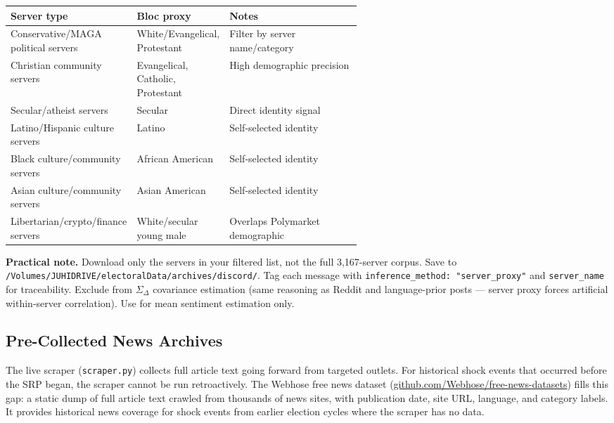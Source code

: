 \documentclass[11pt]{article}
\begin{document}
\begin{center}
\begin{tabularx}{\linewidth}{p{0.36\linewidth}p{0.22\linewidth}X}
\toprule
\textbf{Server type} & \textbf{Bloc proxy} & \textbf{Notes} \\
\midrule
Conservative/MAGA political servers & White/Evangelical, Protestant & Filter by server name/category \\
Christian community servers & Evangelical, Catholic, Protestant & High demographic precision \\
Secular/atheist servers & Secular & Direct identity signal \\
Latino/Hispanic culture servers & Latino & Self-selected identity \\
Black culture/community servers & African American & Self-selected identity \\
Asian culture/community servers & Asian American & Self-selected identity \\
Libertarian/crypto/finance servers & White/secular young male & Overlaps Polymarket demographic \\
\bottomrule
\end{tabularx}
\end{center}

\textbf{Practical note.} Download only the servers in your filtered list, not the
full 3,167-server corpus. Save to
\texttt{/Volumes/JUHIDRIVE/electoralData/archives/discord/}. Tag each message with
\texttt{inference\_method: "server\_proxy"} and \texttt{server\_name} for
traceability. Exclude from $\Sigma_\Delta$ covariance estimation (same reasoning
as Reddit and language-prior posts --- server proxy forces artificial
within-server correlation). Use for mean sentiment estimation only.

\subsection*{Pre-Collected News Archives}

The live scraper (\texttt{scraper.py}) collects full article text going forward from
targeted outlets. For historical shock events that occurred before the SRP began,
the scraper cannot be run retroactively. The Webhose free news dataset
(\url{github.com/Webhose/free-news-datasets}) fills this gap: a static dump of
full article text crawled from thousands of news sites, with publication date, site
URL, language, and category labels. It provides historical news coverage for shock
events from earlier election cycles where the scraper has no data.
\end{document}
